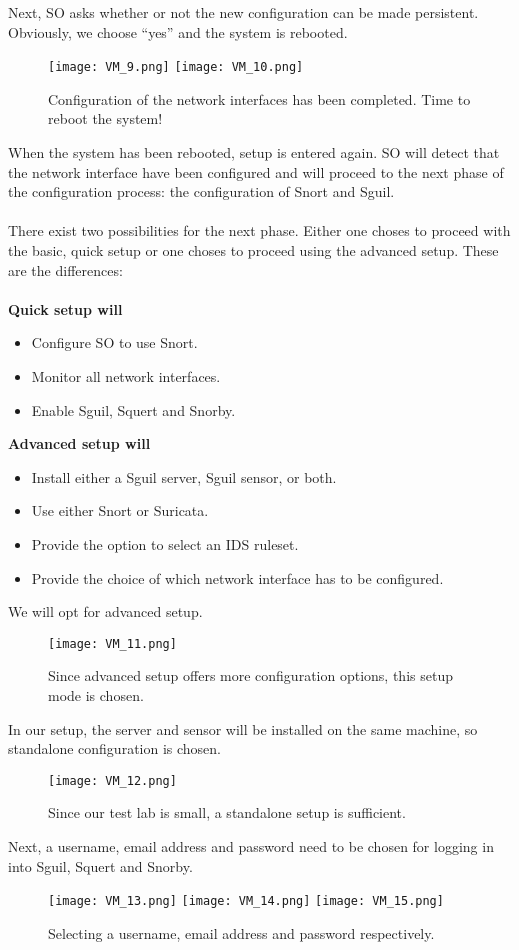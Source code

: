 Next, SO asks whether or not the new configuration can be made persistent. Obviously, we choose ``yes'' and the system is rebooted.
\begin{figure}[h!]
    \centering
  \texttt{[image: VM\_9.png]}
  \texttt{[image: VM\_10.png]}
    \caption{Configuration of the network interfaces has been completed. Time to reboot the system!}
\end{figure}
\clearpage
When the system has been rebooted, setup is entered again. SO will detect that the network interface have been configured and will proceed to the next phase of the configuration process: the configuration of Snort and Sguil. \\ \\
There exist two possibilities for the next phase. Either one choses to proceed with the basic, quick setup or one choses to proceed using the advanced setup. These are the differences: \\ \\
\textbf{Quick setup will}
\begin{itemize}
\item Configure SO to use Snort.
\item Monitor all network interfaces.
\item Enable Sguil, Squert and Snorby.
\end{itemize}
\textbf{Advanced setup will}
\begin{itemize}
\item Install either a Sguil server, Sguil sensor, or both.
\item Use either Snort or Suricata.
\item Provide the option to select an IDS ruleset.
\item Provide the choice of which network interface has to be configured.
\end{itemize}
We will opt for advanced setup. \\
\begin{figure}[h]
    \centering
    \texttt{[image: VM\_11.png]}
    \caption{Since advanced setup offers more configuration options, this setup mode is chosen.}
\end{figure}

In our setup, the server and sensor will be installed on the same machine, so standalone configuration is chosen.
\begin{figure}[h]
    \centering
    \texttt{[image: VM\_12.png]}
    \caption{Since our test lab is small, a standalone setup is sufficient.}
\end{figure}
\clearpage
Next, a username, email address and password need to be chosen for logging in into Sguil, Squert and Snorby.
\begin{figure}[h]
    \centering
    	\texttt{[image: VM\_13.png]}
	\texttt{[image: VM\_14.png]}
 	\texttt{[image: VM\_15.png]}
    \caption{Selecting a username, email address and password respectively.}
\end{figure}

